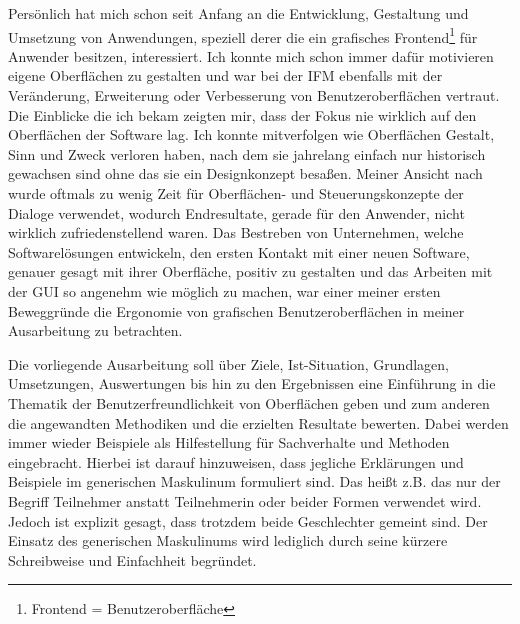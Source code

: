 Persönlich hat mich schon seit Anfang an die Entwicklung, Gestaltung und Umsetzung von Anwendungen, speziell derer die ein grafisches Frontend\footnote{Frontend = Benutzeroberfläche} für Anwender besitzen, interessiert. Ich konnte mich schon immer dafür motivieren eigene Oberflächen zu gestalten und war bei der \gls{IFM} ebenfalls mit der Veränderung, Erweiterung oder Verbesserung von Benutzeroberflächen vertraut. Die Einblicke die ich bekam zeigten mir, dass der Fokus nie wirklich auf den Oberflächen der Software lag. Ich konnte mitverfolgen wie Oberflächen Gestalt, Sinn und Zweck verloren haben, nach dem sie jahrelang einfach nur historisch gewachsen sind ohne das sie ein Designkonzept besaßen. Meiner Ansicht nach wurde oftmals zu wenig Zeit für Oberflächen- und Steuerungskonzepte der Dialoge verwendet, wodurch Endresultate, gerade für den Anwender, nicht wirklich zufriedenstellend waren. Das Bestreben von Unternehmen, welche Softwarelösungen entwickeln, den ersten Kontakt mit einer neuen Software, genauer gesagt mit ihrer Oberfläche, positiv zu gestalten und das Arbeiten mit der \gls{GUI} so angenehm wie möglich zu machen, war einer meiner ersten Beweggründe die Ergonomie von grafischen Benutzeroberflächen in meiner Ausarbeitung zu betrachten. 

Die vorliegende Ausarbeitung soll über Ziele, Ist-Situation, Grundlagen, Umsetzungen, Auswertungen bis hin zu den Ergebnissen eine Einführung in die Thematik der Benutzerfreundlichkeit von Oberflächen geben und zum anderen die angewandten Methodiken und die erzielten Resultate bewerten. Dabei werden immer wieder Beispiele als Hilfestellung für Sachverhalte und Methoden eingebracht. Hierbei ist darauf hinzuweisen, dass jegliche Erklärungen und Beispiele im generischen Maskulinum formuliert sind. Das heißt z.B. das nur der Begriff Teilnehmer anstatt Teilnehmerin oder beider Formen verwendet wird. Jedoch ist explizit gesagt, dass trotzdem beide Geschlechter gemeint sind. Der Einsatz des generischen Maskulinums wird lediglich durch seine kürzere Schreibweise und Einfachheit begründet.

